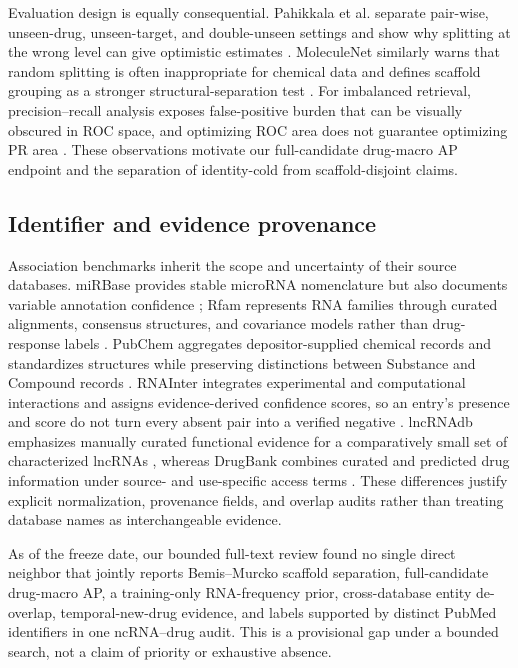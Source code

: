 \documentclass[10pt]{article}
\begin{document}
Evaluation design is equally consequential. Pahikkala et al. separate pair-wise, unseen-drug, unseen-target, and double-unseen settings and show why splitting at the wrong level can give optimistic estimates \citep{pahikkala2015realistic}. MoleculeNet similarly warns that random splitting is often inappropriate for chemical data and defines scaffold grouping as a stronger structural-separation test \citep{wu2018moleculenet}. For imbalanced retrieval, precision--recall analysis exposes false-positive burden that can be visually obscured in ROC space, and optimizing ROC area does not guarantee optimizing PR area \citep{davis2006prroc,saito2015pr}. These observations motivate our full-candidate drug-macro AP endpoint and the separation of identity-cold from scaffold-disjoint claims.

\subsection{Identifier and evidence provenance}

Association benchmarks inherit the scope and uncertainty of their source databases. miRBase provides stable microRNA nomenclature but also documents variable annotation confidence \citep{kozomara2014mirbase}; Rfam represents RNA families through curated alignments, consensus structures, and covariance models rather than drug-response labels \citep{kalvari2021rfam}. PubChem aggregates depositor-supplied chemical records and standardizes structures while preserving distinctions between Substance and Compound records \citep{kim2023pubchem}. RNAInter integrates experimental and computational interactions and assigns evidence-derived confidence scores, so an entry's presence and score do not turn every absent pair into a verified negative \citep{kang2022rnainter}. lncRNAdb emphasizes manually curated functional evidence for a comparatively small set of characterized lncRNAs \citep{quek2015lncrnadb}, whereas DrugBank combines curated and predicted drug information under source- and use-specific access terms \citep{wishart2018drugbank}. These differences justify explicit normalization, provenance fields, and overlap audits rather than treating database names as interchangeable evidence.

As of the freeze date, our bounded full-text review found no single direct neighbor that jointly reports Bemis--Murcko scaffold separation, full-candidate drug-macro AP, a training-only RNA-frequency prior, cross-database entity de-overlap, temporal-new-drug evidence, and labels supported by distinct PubMed identifiers in one ncRNA--drug audit. This is a provisional gap under a bounded search, not a claim of priority or exhaustive absence.
\end{document}
